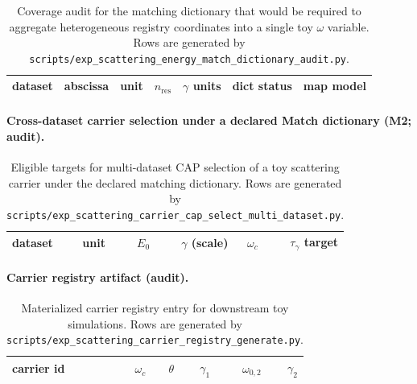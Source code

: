 \begin{table}[H]
\centering
\small
\setlength{\tabcolsep}{8pt}
\renewcommand{\arraystretch}{1.15}
\begin{tabular}{l l l r l l l}
\toprule
dataset & abscissa & unit & $n_{\mathrm{res}}$ & $\gamma$ units & dict status & map model \\
\midrule
%
\end{tabular}
\caption{Coverage audit for the matching dictionary that would be required to aggregate heterogeneous registry coordinates into a single toy $\omega$ variable. Rows are generated by \texttt{scripts/exp\_scattering\_energy\_match\_dictionary\_audit.py}.}
\label{tab:scattering_energy_match_dictionary_audit}
\end{table}

\paragraph{Cross-dataset carrier selection under a declared Match dictionary (M2; audit).}
\AuditTag %

\begin{table}[H]
\centering
\small
\setlength{\tabcolsep}{8pt}
\renewcommand{\arraystretch}{1.15}
\begin{tabular}{l l r r r r}
\toprule
dataset & unit & $E_0$ & $\gamma$ (scale) & $\omega_c$ & $\tau_\gamma$ target \\
\midrule
%
\end{tabular}
\caption{Eligible targets for multi-dataset CAP selection of a toy scattering carrier under the declared matching dictionary. Rows are generated by \texttt{scripts/exp\_scattering\_carrier\_cap\_select\_multi\_dataset.py}.}
\label{tab:scattering_carrier_cap_select_m2}
\end{table}

\paragraph{Carrier registry artifact (audit).}
\AuditTag %

\begin{table}[H]
\centering
\small
\setlength{\tabcolsep}{8pt}
\renewcommand{\arraystretch}{1.15}
\begin{tabular}{l r r r r r}
\toprule
carrier id & $\omega_c$ & $\theta$ & $\gamma_1$ & $\omega_{0,2}$ & $\gamma_2$ \\
\midrule
%
\end{tabular}
\caption{Materialized carrier registry entry for downstream toy simulations. Rows are generated by \texttt{scripts/exp\_scattering\_carrier\_registry\_generate.py}.}
\label{tab:scattering_carrier_registry}
\end{table}

